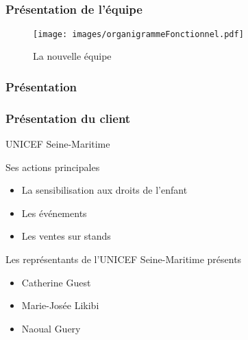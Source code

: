 \subsection{} %

\speaker{\Pierre}

\begin{frame}

\frametitle{Présentation de l'équipe}
	\begin{figure}[!h]
		\begin{center}
			\texttt{[image: images/organigrammeFonctionnel.pdf]}
			\caption{La nouvelle équipe}
		\end{center}
	\end{figure}

\end{frame}

\begin{frame}
\frametitle{Présentation}
	\frametitle{Présentation du client}
	\begin{center}
		UNICEF Seine-Maritime
	\end{center}

	\begin{block}{Ses actions principales}
		\begin{itemize}
			\item La sensibilisation aux droits de l'enfant
			\item Les événements 
			\item Les ventes sur stands
		\end{itemize}
	\end{block}

	\begin{block}{Les représentants de l'UNICEF Seine-Maritime présents}
		\begin{itemize}
			\item Catherine Guest
			\item Marie-Josée Likibi
			\item Naoual Guery
		\end{itemize}
	\end{block}
\end{frame}
